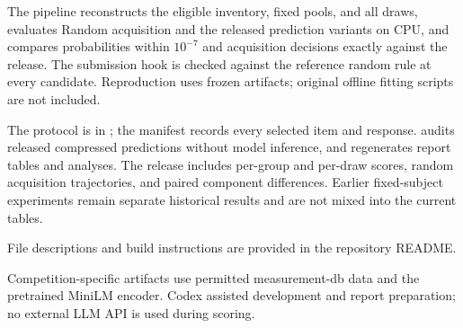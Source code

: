 \documentclass{article}
\begin{document}
The pipeline reconstructs the eligible inventory, fixed pools, and all \ProxyDraws{} draws, evaluates Random acquisition and the released prediction variants on CPU, and compares probabilities within $10^{-7}$ and acquisition decisions exactly against the release. The submission hook is checked against the reference random rule at every candidate. Reproduction uses frozen artifacts; original offline fitting scripts are not included.

The protocol is in ; the manifest records every selected item and response.  audits released compressed predictions without model inference, and  regenerates report tables and analyses. The release includes per-group and per-draw scores, random acquisition trajectories, and paired component differences. Earlier fixed-subject experiments remain separate historical results and are not mixed into the current tables.

File descriptions and build instructions are provided in the repository README.

Competition-specific artifacts use permitted measurement-db data and the pretrained MiniLM encoder. Codex assisted development and report preparation; no external LLM API is used during scoring.



\end{document}
